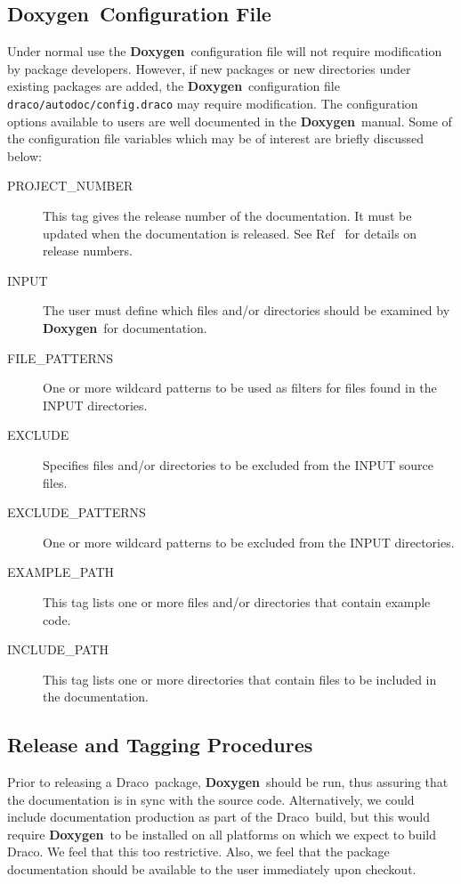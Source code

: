 \documentclass[11pt]{nmemo}
\newcommand{\draco}{{\normalfont\sffamily Draco}}
\newcommand{\doxy}{{\normalfont\bfseries Doxygen}}
\begin{document}
\subsection{\doxy\ Configuration File}
\label{sec:config}

Under normal use the \doxy\ configuration file will not require
modification by package developers. However, if new packages or
new directories under existing packages are added,
the \doxy\ configuration file \texttt{draco/autodoc/config.draco}
may require modification.
The configuration options available to users are well
documented in the \doxy\ manual. Some of the configuration file 
variables which may be of interest are briefly discussed below:

\begin{description}
\item[\ttfamily PROJECT\_NUMBER] This tag gives the release number of
  the documentation.  It must be updated when the documentation is released.
  See  Ref~\cite{xtm:9936} for details on release numbers.
\item[\ttfamily INPUT] The user must define which files and/or
  directories should be  examined by \doxy\ for documentation.  
\item [\ttfamily FILE\_PATTERNS] One or more wildcard patterns to be
  used as filters for files found in the INPUT directories.
\item [\ttfamily EXCLUDE] Specifies files and/or directories to be
   excluded from the INPUT source files.
\item [\ttfamily EXCLUDE\_PATTERNS] One or more wildcard patterns to be
  excluded from the INPUT directories.
\item [\ttfamily EXAMPLE\_PATH] This tag lists one or more files and/or
  directories that contain example code.
\item [\ttfamily INCLUDE\_PATH] This tag lists one or more 
  directories that contain files to be included in the documentation.

\end{description}

\subsection{Release and Tagging Procedures}
Prior to releasing a \draco\ package, 
\doxy\ should be run, thus assuring that the documentation is in sync
with the source code. Alternatively, we could include documentation
production as part of the \draco\ build, but this would require
\doxy\ to be installed on all platforms on which we expect to build
\draco.  We feel that this too restrictive. Also, we feel that
the package documentation should be available to the user immediately
upon checkout.
\end{document}
